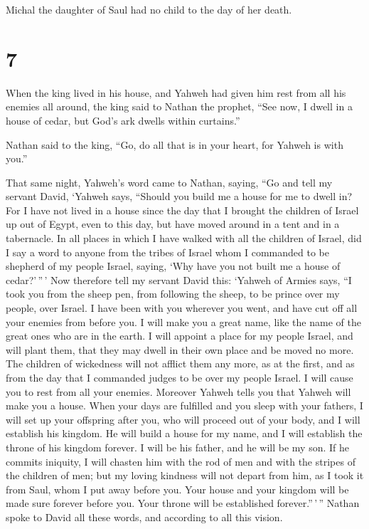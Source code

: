  Michal the daughter of Saul had no child to the day of her
death.

\hypertarget{section-6}{%
\section{7}\label{section-6}}

 When the king lived in his house, and Yahweh had given him
rest from all his enemies all around,  the king said to
Nathan the prophet, ``See now, I dwell in a house of cedar, but God's
ark dwells within curtains.''

 Nathan said to the king, ``Go, do all that is in your
heart, for Yahweh is with you.''

 That same night, Yahweh's word came to Nathan, saying,
 ``Go and tell my servant David, `Yahweh says, ``Should you
build me a house for me to dwell in?  For I have not lived
in a house since the day that I brought the children of Israel up out of
Egypt, even to this day, but have moved around in a tent and in a
tabernacle.  In all places in which I have walked with all
the children of Israel, did I say a word to anyone from the tribes of
Israel whom I commanded to be shepherd of my people Israel, saying, `Why
have you not built me a house of cedar?'\,''\,'  Now
therefore tell my servant David this: `Yahweh of Armies says, ``I took
you from the sheep pen, from following the sheep, to be prince over my
people, over Israel.  I have been with you wherever you
went, and have cut off all your enemies from before you. I will make you
a great name, like the name of the great ones who are in the earth.
 I will appoint a place for my people Israel, and will
plant them, that they may dwell in their own place and be moved no more.
The children of wickedness will not afflict them any more, as at the
first,  and as from the day that I commanded judges to be
over my people Israel. I will cause you to rest from all your enemies.
Moreover Yahweh tells you that Yahweh will make you a house.
 When your days are fulfilled and you sleep with your
fathers, I will set up your offspring after you, who will proceed out of
your body, and I will establish his kingdom.  He will build
a house for my name, and I will establish the throne of his kingdom
forever.  I will be his father, and he will be my son. If
he commits iniquity, I will chasten him with the rod of men and with the
stripes of the children of men;  but my loving kindness
will not depart from him, as I took it from Saul, whom I put away before
you.  Your house and your kingdom will be made sure forever
before you. Your throne will be established forever.''\,'\,''
 Nathan spoke to David all these words, and according to
all this vision.

